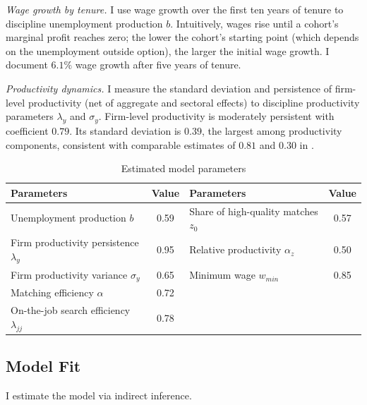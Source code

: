 \emph{Wage growth by tenure.} I use wage growth over the first ten years of tenure to discipline unemployment production $b$. Intuitively, wages rise until a cohort’s marginal profit reaches zero; the lower the cohort’s starting point (which depends on the unemployment outside option), the larger the initial wage growth. I document $6.1\%$ wage growth after five years of tenure.

\emph{Productivity dynamics.} I measure the standard deviation and persistence of firm-level productivity (net of aggregate and sectoral effects) to discipline productivity parameters $\lambda_y$ and $\sigma_y$. Firm-level productivity is moderately persistent with coefficient $0.79$. Its standard deviation is $0.39$, the largest among productivity components, consistent with comparable estimates of $0.81$ and $0.30$ in \textcite{souchier2022}.


\begin{table}
    \centering
    \begin{tabular}{lc|lc}
    Parameters & Value & Parameters & Value \\
    \hline
    \hline
    Unemployment production $b$    &   0.59 &  Share of high-quality matches $z_0$& 0.57  \\
    Firm productivity persistence $\lambda_y$    &   0.95  &  Relative productivity $\alpha_z$ & 0.50     \\
    Firm productivity variance $\sigma_y$      &  0.65      & Minimum wage $w_{min}$ &  0.85\\%
    Matching efficiency $\alpha$                   &   0.72  &  & \\%
    On-the-job search efficiency $\lambda_{jj}$&   0.78     &   & \\
    \hline
    \end{tabular}
    \caption{Estimated model parameters}
    \label{tab:parameters}
\end{table}

\subsection{Model Fit}
I estimate the model via indirect inference. 

